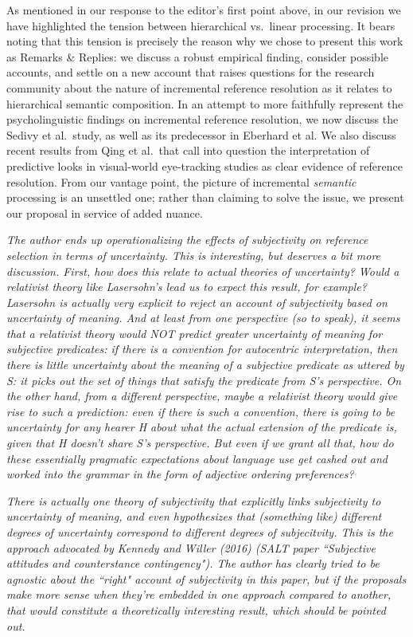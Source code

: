 \documentclass[12pt]{article}
\begin{document}
As mentioned in our response to the editor's first point above, in our revision we have highlighted the tension between hierarchical vs.~linear processing. It bears noting that this tension is precisely the reason why we chose to present this work as Remarks \& Replies: we discuss a robust empirical finding, consider possible accounts, and settle on a new account that raises questions for the research community about the nature of incremental reference resolution as it relates to hierarchical semantic composition. In an attempt to more faithfully represent the psycholinguistic findings on incremental reference resolution, we now discuss the Sedivy et al.~study, as well as its predecessor in Eberhard et al. We also discuss recent results from Qing et al.~that call into question the interpretation of predictive looks in visual-world eye-tracking studies as clear evidence of reference resolution. From our vantage point, the picture of incremental \emph{semantic} processing is an unsettled one; rather than claiming to solve the issue, we present our proposal in service of added nuance. 


\item \emph{The author ends up operationalizing the effects of subjectivity on
reference selection in terms of uncertainty.  This is interesting, but
deserves a bit more discussion.  First, how does this relate to actual
theories of uncertainty?  Would a relativist theory like Lasersohn's lead us
to expect this result, for example? Lasersohn is actually very explicit to
reject an account of subjectivity based on uncertainty of meaning. And at
least from one perspective (so to speak), it seems that a relativist theory
would NOT predict greater uncertainty of meaning for subjective predicates: 
if there is a convention for autocentric interpretation, then there is
little uncertainty about the meaning of a subjective predicate as uttered by
S:  it picks out the set of things that satisfy the predicate from S's
perspective.  On the other hand, from a different perspective, maybe a
relativist theory would give rise to such a prediction:  even if there is
such a convention, there is going to be uncertainty for any hearer H about
what the actual extension of the predicate is, given that H doesn't share
S's perspective.  But even if we grant all that, how do these essentially
pragmatic expectations about language use get cashed out and worked into the
grammar in the form of adjective ordering preferences?}

\emph{There is actually one theory of subjectivity that explicitly links
subjectivity to uncertainty of meaning, and even hypothesizes that
(something like) different degrees of uncertainty correspond to different
degrees of subjecitvity.  This is the approach advocated by Kennedy and
Willer (2016) (SALT paper ``Subjective attitudes and counterstance
contingency").  The author has clearly tried to be agnostic about the
``right" account of subjectivity in this paper, but if the proposals make
more sense when they're embedded in one approach compared to another, that
would constitute a theoretically interesting result, which should be pointed
out.}
\end{document}
